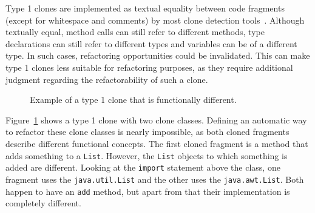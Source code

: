 Type 1 clones are implemented as textual equality between code fragments (except for whitespace and comments) by most clone detection tools~\cite{kamiya2002ccfinder, semura2017ccfindersw, roy2008nicad, svajlenko2016bigcloneeval, svajlenko2014evaluating}. Although textually equal, method calls can still refer to different methods, type declarations can still refer to different types and variables can be of a different type. In such cases, refactoring opportunities could be invalidated. This can make type 1 clones less suitable for refactoring purposes, as they require additional judgment regarding the refactorability of such a clone. %

\begin{figure}[H]
\begin{parcolumns}{2}
\end{parcolumns}
\caption{Example of a type 1 clone that is functionally different.}
\label{fig:type1}
\end{figure}

Figure~\ref{fig:type1} shows a type 1 clone with two clone classes. Defining an automatic way to refactor these clone classes is nearly impossible, as both cloned fragments describe different functional concepts. The first cloned fragment is a method that adds something to a \texttt{List}. However, the \texttt{List} objects to which something is added are different. Looking at the \texttt{import} statement above the class, one fragment uses the \texttt{java.util.List} and the other uses the \texttt{java.awt.List}. Both happen to have an \texttt{add} method, but apart from that their implementation is completely different.

